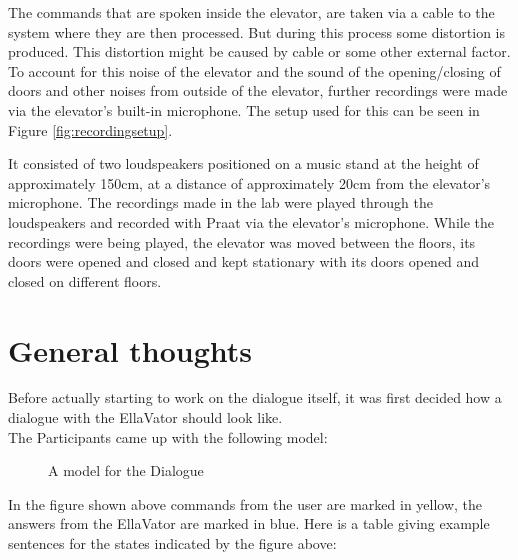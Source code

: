 \documentclass[a4paper, 12pt]{article}
\begin{document}
The commands that are spoken inside the elevator, are taken via a cable to the system where they are then processed. But during this process some distortion is produced. This distortion might be caused by cable or some other external factor. To account for this noise of the elevator and the sound of the opening/closing of doors and other noises from outside of the elevator, further recordings were made via the elevator's built-in microphone. The setup used for this can be seen in Figure \ref{fig:recordingsetup}.

It consisted of two loudspeakers positioned on a music stand at the height of approximately 150cm, at a distance of approximately 20cm from the elevator's microphone.
The recordings made in the lab were played through the loudspeakers and recorded with Praat via the elevator's microphone.
While the recordings were being played, the elevator was moved between the floors, its doors were opened and closed and kept stationary with its doors opened and closed on different floors.

\newpage
\section{General thoughts}
\label{sec:General_thoughts}
Before actually starting to work on the dialogue itself, it was first decided how a dialogue with the EllaVator should look like. \\

The Participants came up with the following model: \\


\begin{figure} [ht]
  \caption{A model for the Dialogue}
  \label{fig: Dialogue flow}
\end{figure}

In the figure shown above commands from the user are marked in yellow, the answers from the EllaVator are marked in blue.
Here is a table giving example sentences for the states indicated by the figure above: \\
\end{document}
